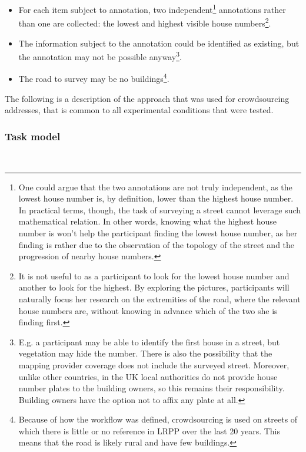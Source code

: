 \begin{itemize}
        
    \item For each item subject to annotation, two independent\footnote{One could argue that the two annotations are not truly independent, as the lowest house number is, by definition, lower than the highest house number. In practical terms, though, the task of surveying a street cannot leverage such mathematical relation. In other words, knowing what the highest house number is won't help the participant finding the lowest house number, as her finding is rather due to the observation of the topology of the street and the progression of nearby house numbers.} annotations rather than one are collected: the lowest and highest visible house numbers\footnote{It is not useful to as a participant to look for the lowest house number and another to look for the highest. By exploring the pictures, participants will naturally focus her research on the extremities of the road, where the relevant house numbers are, without knowing in advance which of the two she is finding first.}.
        
    \item The information subject to the annotation could be identified as existing, but the annotation may not be possible anyway\footnote{E.g. a participant may be able to identify the first house in a street, but vegetation may hide the number. There is also the possibility that the mapping provider coverage does not include the surveyed street. Moreover, unlike other countries, in the UK local authorities do not provide house number plates to the building owners, so this remains their responsibility. Building owners have the option not to affix any plate at all.}.
        
    \item The road to survey may be no buildings\footnote{Because of how the workflow was defined, crowdsourcing is used on streets of which there is little or no reference in LRPP over the last 20 years. This means that the road is likely rural and have few buildings.}.
        
\end{itemize}
    
The following is a description of the approach that was used for crowdsourcing addresses, that is common to all experimental conditions that were tested.

\subsubsection{Task model} \leavevmode \\ %

